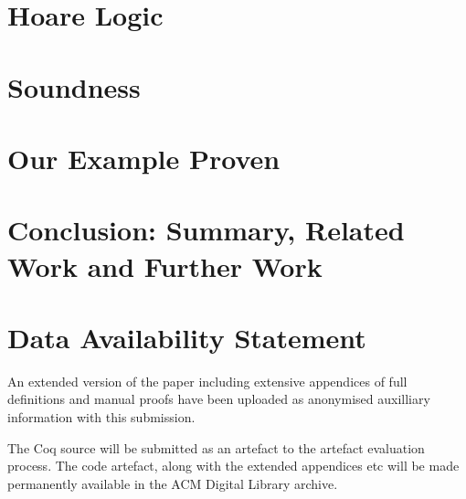 \documentclass[acmsmall,review,anonymous,screen]{acmart}\settopmatter{printfolios=true,printacmref=false}
\begin{document}

\section{Hoare Logic} %
\label{sect:proofSystem}
 
 
 
 \section{Soundness} %
 \label{sect:sound:proofSystem}


  \section{Our Example Proven} %
 \label{sect:example:proof:short}


  \section{Conclusion: Summary, Related Work and Further Work}
 \label{sect:related}
\label{sect:conclusion}
 

%  
%




%
% 
%
% 

\clearpage
\section*{Data Availability Statement}

An extended version of the paper including extensive appendices of
full definitions and manual proofs have been uploaded as anonymised
auxilliary information with this submission.

The Coq source will be submitted as an artefact to
the artefact evaluation process. The code artefact, along with
the extended appendices etc will be made permanently available in the
ACM Digital Library archive.
\end{document}
